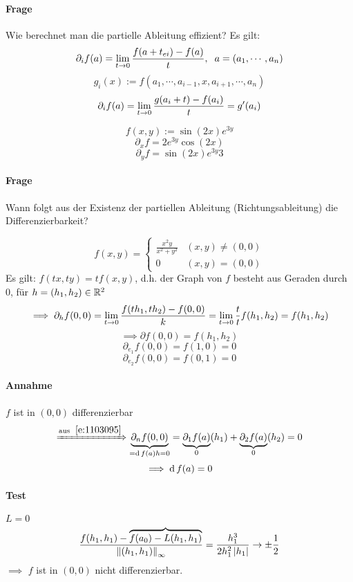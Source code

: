 \paragraph{Frage}
Wie berechnet man die partielle Ableitung effizient? Es gilt:
\[\partial_if(a)=\displaystyle\lim_{t\rightarrow0}\frac{f(a+t_{ei})-f(a)}{t},\hspace{2mm} a=(a_1,\cdots,a_n)\]
\[g_i(x):=f(a_1,\cdots,a_{i-1},x,a_{i+1},\cdots,a_n)\]
\[\partial_if(a)=\displaystyle\lim_{t\rightarrow0}\frac{g(a_i+t)-f(a_i)}{t}=g'(a_i)\]
\begin{Bsp}
  \[f(x,y):=\sin(2x)e^{3y}\]
  \[\partial_xf=2e^{3y}\cos(2x)\]
  \[\partial_yf=\sin(2x)e^{3y}3\]
\end{Bsp}
\paragraph{Frage}
Wann folgt aus der Existenz der partiellen Ableitung (Richtungsableitung) die Differenzierbarkeit?
\begin{Bsp}
  \[f(x,y)= \begin{cases}
    \frac{x^2y}{x^2+y^2}&(x,y)\neq(0,0)\\
    0&(x,y)=(0,0)
  \end{cases}\]
  Es gilt: $f(tx,ty)=tf(x,y)$, d.h. der Graph von $f$ besteht aus Geraden durch $0$, für $h=(h_1,h_2)\in\mathbb{R}^2$
  \[\implies \partial_hf(0,0)=\displaystyle\lim_{t\rightarrow0}\frac{f(th_1,th_2)-f(0,0)}{k}=\displaystyle\lim_{t\rightarrow0}\frac{t}{t}f(h_1,h_2)=f(h_1,h_2)\]
  \[\implies \partial f(0,0)=f(h_1,h_2)\]
  \[\partial_{e_1}f(0,0)=f(1,0)=0\]
  \[\partial_{e_2}f(0,0)=f(0,1)=0\]
  \paragraph{Annahme}
  $f$ ist in $(0,0)$ differenzierbar
  \[\xRightarrow{\text{aus}\hspace{2mm}\ref{e:1103095}}\underbrace{\partial_nf(0,0)}_{=\operatorname{d} f(a)h=0}=\underbrace{\partial_1f(a)}_{0}(h_1)+\underbrace{\partial_2f(a)}_0(h_2)=0\]
  \[\implies \operatorname{d} f(a)=0\]
  \paragraph{Test}
  $L=0$
  \[\frac{f(h_1,h_1)-\overbrace{f(a_0)-L(h_1,h_1)}}{\left\| (h_1,h_1) \right\|_\infty}=\frac{h_1^3}{2h_1^2\left| h_1 \right|}\rightarrow\pm\frac{1}{2}\]
  $\implies$ $f$ ist in $(0,0)$ nicht differenzierbar.
\end{Bsp}
